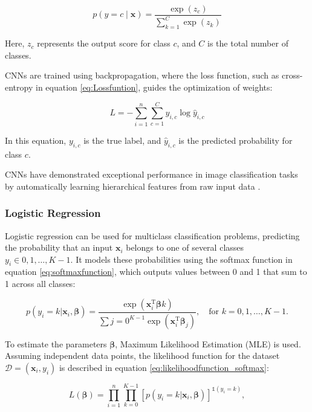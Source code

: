 \begin{equation}
    p(y = c \mid \boldsymbol{x}) = \frac{\exp(z_c)}{\sum_{k=1}^C \exp(z_k)}
    \label{eq:softmaxfunction}
\end{equation}

Here, \(z_c\) represents the output score for class \(c\), and \(C\) is the total number of classes.

CNNs are trained using backpropagation, where the loss function, such as cross-entropy in equation \ref{eq:Lossfuntion}, guides the optimization of weights:

\begin{equation}
    L = -\sum_{i=1}^n \sum_{c=1}^C y_{i,c} \log \hat{y}_{i,c}
    \label{eq:Lossfuntion}
\end{equation}

In this equation, \(y_{i,c}\) is the true label, and \(\hat{y}_{i,c}\) is the predicted probability for class \(c\).

CNNs have demonstrated exceptional performance in image classification tasks by automatically learning hierarchical features from raw input data \cite{raschka2022machine}.

\subsubsection{Logistic Regression}

Logistic regression can be used for multiclass classification problems, predicting the probability that an input $\boldsymbol{x}_i$ belongs to one of several classes $y_i \in {0, 1, \dots, K-1}$. It models these probabilities using the softmax function in equation \ref{eq:softmaxfunction}, which outputs values between 0 and 1 that sum to 1 across all classes:

\begin{equation}
p(y_i = k \vert \boldsymbol{x}_i, \boldsymbol{\beta}) = \frac{\exp(\boldsymbol{x}_i^\mathrm{T} \boldsymbol{\beta}k)}{\sum{j=0}^{K-1} \exp(\boldsymbol{x}_i^\mathrm{T} \boldsymbol{\beta}_j)}, \quad \text{for } k = 0, 1, \dots, K-1.
\label{eq:softmaxfunction}
\end{equation}

To estimate the parameters $\boldsymbol{\beta}$, Maximum Likelihood Estimation (MLE) is used. Assuming independent data points, the likelihood function for the dataset $\mathcal{D} = { (\boldsymbol{x}_i, y_i) }$ is described in equation \ref{eq:likelihoodfunction_softmax}:

\begin{equation}
L(\boldsymbol{\beta}) = \prod_{i=1}^n \prod_{k=0}^{K-1} [p(y_i = k \vert \boldsymbol{x}_i, \boldsymbol{\beta})]^{\mathbb{1}(y_i = k)},
\label{eq:likelihoodfunction_softmax}
\end{equation}

